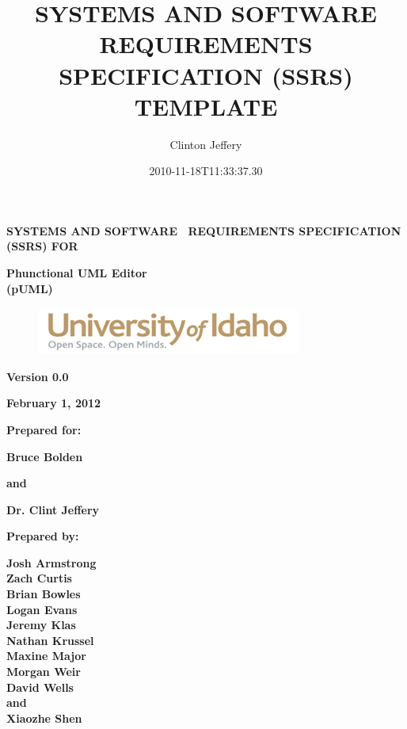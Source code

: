 \documentclass[twoside,letterpaper]{article}
\title{SYSTEMS AND SOFTWARE REQUIREMENTS SPECIFICATION (SSRS) TEMPLATE}
\author{Clinton Jeffery}
\date{2010-11-18T11:33:37.30}
\begin{document}
\clearpage
{\centering{}\bfseries\color{black}
SYSTEMS AND SOFTWARE \ REQUIREMENTS SPECIFICATION (SSRS) FOR
\par}


\bigskip

{\centering{}\bfseries\color{black}
Phunctional UML Editor
\\(pUML)
\par}


\bigskip


\bigskip


\bigskip

\begin{figure}
\centering
\includegraphics[width=3.4362in,height=0.6134in]{SSRSTemplateA2-img1.png}
\end{figure}

\bigskip


\bigskip

{\centering{}\bfseries\color{black}
Version 0.0
\par}

{\centering{}\bfseries\color{black}
February 1, 2012
\par}


\bigskip


\bigskip

{\centering{}\bfseries\color{black}
Prepared for:
\par}
{\centering{}\bfseries\color{black}
Bruce Bolden
\par}
{\centering{}\bfseries\color{black}
and
\par}
{\centering{}\bfseries\color{black}
Dr. Clint Jeffery
\par}

\bigskip


\bigskip

{\centering{}\bfseries\color{black}
Prepared by:
\par}

{\centering{}\bfseries\color{black}
Josh Armstrong
\\Zach Curtis
\\Brian Bowles
\\Logan Evans
\\Jeremy Klas
\\Nathan Krussel
\\Maxine Major
\\Morgan Weir
\\David Wells
\\and
\\Xiaozhe Shen
\par}
\end{document}
